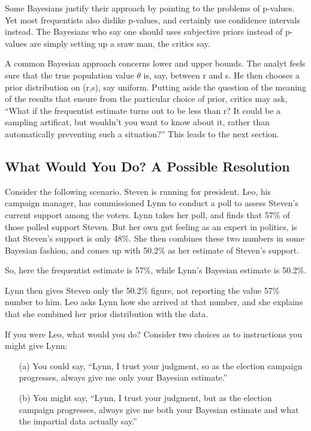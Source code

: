 Some Bayesians justify their approach by pointing to the problems of
p-values.  Yet most frequentists also dislike p-values, and certainly
use confidence intervals instead.  The Bayesians who say one should uses
subjective priors instead of p-values are simply setting up a sraw man,
the critics say.

A common Bayesian approach concerns lower and upper bounds.  The analyt
feels sure that the true population value $\theta$ is, say, between r
and s.  He then chooses a prior distribution on (r,s), say uniform.
Putting aside the question of the meaning of the results that ensure
from the particular choice of prior, critics may ask, ``What if the
frequentist estimate turns out to be less than r?  It could be a
sampling artificat, but wouldn't you want to know about it, rather than
automatically preventing such a situation?''  This leads to the next
section.

\subsection{What Would You Do?  A Possible Resolution}

Consider the following scenario.  Steven is running for president.  Leo,
his campaign manager, has commissioned Lynn to conduct a poll to assess
Steven's current support among the voters.  Lynn takes her poll, and
finds that 57\% of those polled support Steven.  But her own gut
feeling as an expert in politics, is that Steven's support is only 48\%.
She then combines these two numbers in some Bayesian fashion, and comes
up with 50.2\% as her estimate of Steven's support.  

So, here the frequentist estimate is 57\%, while Lynn's Bayesian
estimate is 50.2\%.

Lynn then gives Steven only the 50.2\% figure, not reporting the value
57\% number to him.  Leo asks Lynn how she arrived at that number, and
she explains that she combined her prior distribution with the data.  

If you were Leo, what would you do?  Consider two choices as to
instructions you might give Lynn:

\begin{itemize}

\item [(a)] You could say, ``Lynn, I trust your judgment, so as the
election campaign progresses, always give me only your Bayesian
estimate.''

\item [(b)] You might say, ``Lynn, I trust your judgment, but as the
election campaign progresses, always give me both your Bayesian
estimate and what the impartial data actually say.''

\end{itemize}

